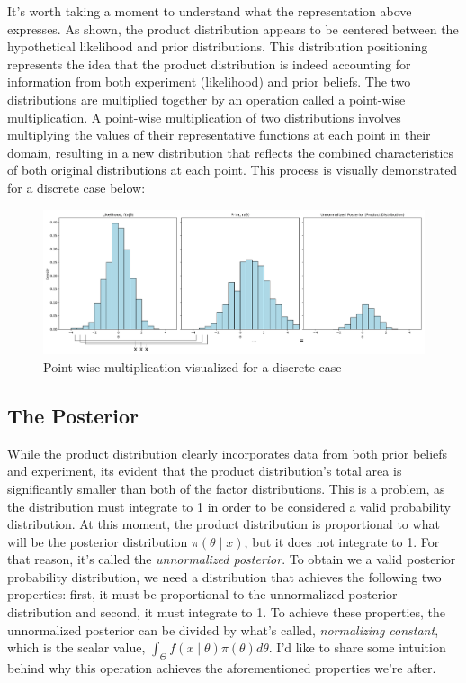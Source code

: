 \documentclass[12pt]{article}
\begin{document}
\noindent It's worth taking a moment to understand what the representation above expresses. As shown, the product distribution appears to be centered between the hypothetical likelihood and prior distributions. This distribution positioning represents the idea that the product distribution is indeed accounting for information from both experiment (likelihood) and prior beliefs. The two distributions are multiplied together by an operation called a point-wise multiplication. A point-wise multiplication of two distributions involves multiplying the values of their representative functions at each point in their domain, resulting in a new distribution that reflects the combined characteristics of both original distributions at each point. This process is visually demonstrated for a discrete case below:

\begin{figure}[h!]
\centering
\includegraphics[width=1.0\textwidth]{assets/visual_9.png} 
\caption{Point-wise multiplication visualized for a discrete case}
\label{fig:cond_prob}
\end{figure}

\subsection*{The Posterior}
\noindent While the product distribution clearly incorporates data from both prior beliefs and experiment, its evident that the product distribution's total area is significantly smaller than both of the factor distributions. This is a problem, as the distribution must integrate to 1 in order to be considered a valid probability distribution. At this moment, the product distribution is proportional to what will be the posterior distribution $\pi(\theta \mid x)$, but it does not integrate to 1. For that reason, it's called the \textit{unnormalized posterior}. To obtain we a valid posterior probability distribution, we need a distribution that achieves the following two properties: first, it must be proportional to the unnormalized posterior distribution and second, it must integrate to 1. To achieve these properties, the unnormalized posterior can be divided by what's called, \textit{normalizing constant}, which is the scalar value, $\int_{\Theta} f(x \mid \theta) \pi(\theta) d\theta$. I'd like to share some intuition behind why this operation achieves the aforementioned properties we're after.\\
\end{document}
